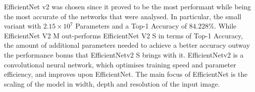 EfficientNet v2 was chosen since it proved to be the most performant while being the most accurate of the networks that were analysed. In particular, the small variant with $2.15 \times 10^7$ Parameters and a Top-1 Accuracy of $84.228\%$\cite[]{tan2021efficientnetv2}.  While EfficientNet V2 M out-performs EfficientNet V2 S in terms of Top-1 Accuracy, the amount of additional parameters needed to achieve a better accuracy outway the performance bonus that EfficientNetv2 S brings with it. EfficientNetv2 is a convolutional neural network, which optimises training speed and parameter efficiency, and improves upon EfficientNet\cite{tan2020efficientnet}. The main focus of EfficientNet is the scaling of the model in width, depth and resolution of the input image. 
